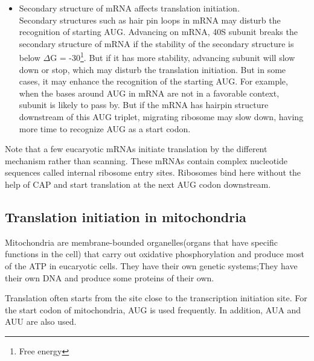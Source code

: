 \begin{itemize}
\item Secondary structure of mRNA affects translation initiation.\\
Secondary structures such as hair pin loops in mRNA may disturb the 
recognition of starting AUG\cite{label21}. Advancing on mRNA, 
40S subunit breaks the secondary structure of mRNA if the stability
of the secondary structure is below \(\Delta\)G = -30\footnote{Free
energy}. But if it has 
more stability, advancing subunit will slow down or stop, which may
disturb the translation initiation.
But in some cases, it may enhance the recognition of the 
starting AUG\cite{label2}. For example, when the bases around AUG
in mRNA are not in a favorable context, subunit is likely to pass by. 
But if the mRNA has hairpin structure downstream of this AUG triplet,
migrating ribosome may slow down, having more time to recognize AUG
as a start codon.
\end{itemize}

Note that a few eucaryotic mRNAs initiate translation by the different
mechanism 
rather than scanning. These mRNAs contain complex nucleotide
sequences called internal ribosome entry sites. Ribosomes bind here
without the help of CAP and start translation at the next AUG codon
downstream\cite{label0}.  

\subsection{Translation initiation in mitochondria}
Mitochondria are membrane-bounded organelles(organs that have specific
functions in the cell) that carry out oxidative phosphorylation and
produce most of the ATP in eucaryotic cells. They have their own
genetic systems;They have their own DNA and produce some proteins
of their own. 

Translation often starts from the site close to the transcription 
initiation site. 
For the start codon of mitochondria, AUG is used frequently. In addition, AUA
and AUU are also used.  

